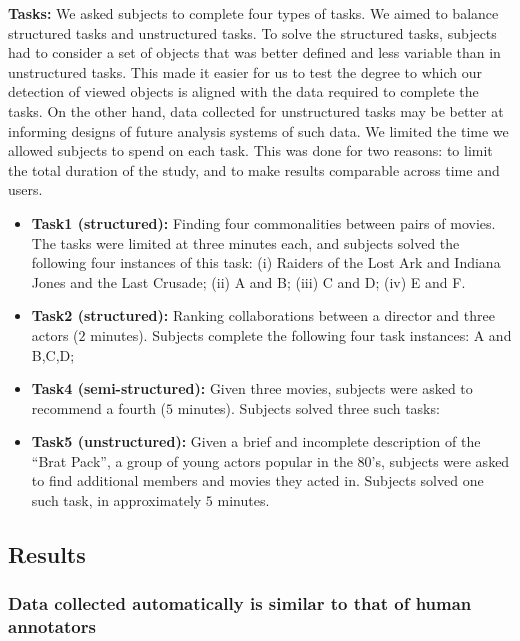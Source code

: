 \textbf{Tasks:} We asked subjects to complete four types of tasks. We aimed to balance structured tasks and unstructured tasks. To solve the structured tasks, subjects had to consider a set of objects that was better defined and less variable than in unstructured tasks. This made it easier for us to test the degree to which our detection of viewed objects is aligned with the data required to complete the tasks. On the other hand, data collected for unstructured tasks may be better at informing designs of future analysis systems of such data. We limited the time we allowed subjects to spend on each task. This was done for two reasons: to limit the total duration of the study, and to make results comparable across time and users.

\begin{itemize}
	\item \textbf{Task1 (structured):} Finding four commonalities between pairs of movies. The tasks were limited at three minutes each, and subjects solved the following four instances of this task: (i) Raiders of the Lost Ark and Indiana Jones and the Last Crusade; (ii) A and B; (iii) C and D; (iv) E and F.  
	\item \textbf{Task2 (structured):} Ranking collaborations between a director and three actors ($2$ minutes).  Subjects complete the following four task instances: A and B,C,D; 
	\item \textbf{Task4 (semi-structured):} Given three movies, subjects were asked to recommend a fourth ($5$ minutes). Subjects solved three such tasks: 
	\item \textbf{Task5 (unstructured):} Given a brief and incomplete description of the ``Brat Pack'', a group of young actors popular in the 80's, subjects were asked to find additional members and movies they acted in. Subjects solved one such task, in approximately $5$ minutes. 
\end{itemize}

\subsection{Results}
\subsubsection{Data collected automatically is similar to that of human annotators}
\label{sec:EvalResults}

